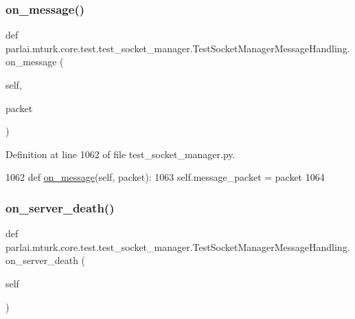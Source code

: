 \subsubsection{\texorpdfstring{on\+\_\+message()}{on\_message()}}
{\footnotesize\ttfamily def parlai.\+mturk.\+core.\+test.\+test\+\_\+socket\+\_\+manager.\+Test\+Socket\+Manager\+Message\+Handling.\+on\+\_\+message (\begin{DoxyParamCaption}\item[{}]{self,  }\item[{}]{packet }\end{DoxyParamCaption})}



Definition at line 1062 of file test\+\_\+socket\+\_\+manager.\+py.


\begin{DoxyCode}
1062     \textcolor{keyword}{def }\hyperlink{namespaceparlai_1_1chat__service_1_1services_1_1terminal__chat_1_1client_a0ef2bb2bd3b966dcdd8402a92b999708}{on\_message}(self, packet):
1063         self.message\_packet = packet
1064 
\end{DoxyCode}
\mbox{\label{classparlai_1_1mturk_1_1core_1_1test_1_1test__socket__manager_1_1TestSocketManagerMessageHandling_a6550815e562fabf489e4aacf809d8650}} 
\subsubsection{\texorpdfstring{on\+\_\+server\+\_\+death()}{on\_server\_death()}}
{\footnotesize\ttfamily def parlai.\+mturk.\+core.\+test.\+test\+\_\+socket\+\_\+manager.\+Test\+Socket\+Manager\+Message\+Handling.\+on\+\_\+server\+\_\+death (\begin{DoxyParamCaption}\item[{}]{self }\end{DoxyParamCaption})}



